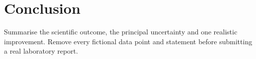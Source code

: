 \documentclass[10pt,a4paper]{article}
\begin{document}
\section{Conclusion}
Summarise the scientific outcome, the principal uncertainty and one realistic
improvement. Remove every fictional data point and statement before
submitting a real laboratory report.




%
\end{document}
